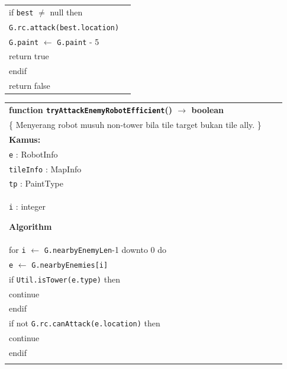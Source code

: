 \documentclass{article}
\newenvironment{pseudobox}
{
\centering
\begin{longtable}{|p{0.94\linewidth}|}
\hline
}
{
\\ \hline
\end{longtable}
\vspace{0.05cm}
}
\begin{document}
\begin{enumerate}[label=\alph*.]
\begin{enumerate}[label=\alph*.]
\begin{pseudobox}
\hspace*{1.5em}if \texttt{best} $\neq$ null then \\
\hspace*{3em}\texttt{G.rc.attack(best.location)} \\
\hspace*{3em}\texttt{G.paint} $\leftarrow$ \texttt{G.paint} - 5 \\
\hspace*{3em}return true \\
\hspace*{1.5em}endif \\

\hspace*{1.5em}return false
\end{pseudobox}

\begin{pseudobox}
\textbf{function \texttt{tryAttackEnemyRobotEfficient}() $\rightarrow$ boolean} \\
\{ Menyerang robot musuh non-tower bila tile target bukan tile ally. \}\\

\textbf{Kamus:} \\
\hspace*{1.5em}\texttt{e} : RobotInfo \\
\hspace*{1.5em}\texttt{tileInfo} : MapInfo \\
\hspace*{1.5em}\texttt{tp} : PaintType \\
\hspace*{1.5em}\texttt{i} : integer

\textbf{Algorithm} \\
\hspace*{1.5em}for \texttt{i} $\leftarrow$ \texttt{G.nearbyEnemyLen}-1 downto 0 do \\
\hspace*{3em}\texttt{e} $\leftarrow$ \texttt{G.nearbyEnemies[i]} \\

\hspace*{3em}if \texttt{Util.isTower(e.type)} then \\
\hspace*{4.5em}continue \\
\hspace*{3em}endif \\

\hspace*{3em}if not \texttt{G.rc.canAttack(e.location)} then \\
\hspace*{4.5em}continue \\
\hspace*{3em}endif \\


\end{pseudobox}
\end{enumerate}
\end{enumerate}
\end{document}
